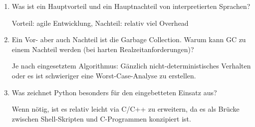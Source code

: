 \begin{enumerate}

  \item Was ist ein Hauptvorteil und ein Hauptnachteil von interpretierten Sprachen?

        Vorteil: agile Entwicklung, Nachteil: relativ viel Overhead

  \item Ein Vor- aber auch Nachteil ist die Garbage Collection. Warum kann GC zu einem Nachteil werden (bei harten Realzeitanforderungen)?

        Je nach eingesetztem Algorithmus: Gänzlich nicht-deterministisches
        Verhalten oder es ist schwieriger eine Worst-Case-Analyse zu erstellen.

  \item Was zeichnet Python besonders für den eingebetteten Einsatz aus?

        Wenn nötig, ist es relativ leicht via C/C++ zu erweitern, da es als
        Brücke zwischen Shell-Skripten und C-Programmen konzipiert ist.

\end{enumerate}
